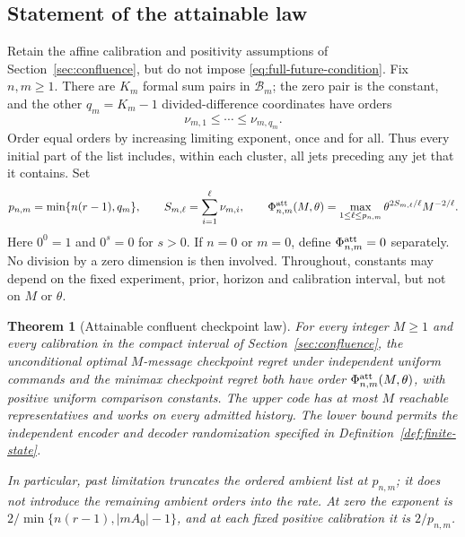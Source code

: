 \documentclass[11pt]{amsart}
\newtheorem{theorem}{Theorem}[section]
\theoremstyle{definition}\newtheorem{definition}[theorem]{Definition}
\theoremstyle{remark}\newtheorem{remark}[theorem]{Remark}
\begin{document}
\subsection{Statement of the attainable law}
Retain the affine calibration and positivity assumptions of
Section~\ref{sec:confluence}, but do not impose
\eqref{eq:full-future-condition}. Fix $n,m\ge1$. There are $K_m$ formal
sum pairs in $\mathcal B_m$; the zero pair is the constant, and the other
$q_m=K_m-1$ divided-difference coordinates have orders
\[
 \nu_{m,1}\le\cdots\le\nu_{m,q_m}.
\]
Order equal orders by increasing limiting exponent, once and for all.
Thus every initial part of the list includes, within each cluster, all
jets preceding any jet that it contains. Set
\begin{equation}\label{eq:attainable-orders}
 p_{n,m}=\min\{n(r-1),q_m\},\qquad
 S_{m,\ell}=\sum_{i=1}^{\ell}\nu_{m,i},\qquad
 \Phi^{\rm att}_{n,m}(M,\theta)
 =\max_{1\le\ell\le p_{n,m}}
       \theta^{2S_{m,\ell}/\ell}M^{-2/\ell}.
\end{equation}
Here $0^0=1$ and $0^s=0$ for $s>0$. If $n=0$ or $m=0$, define
$\Phi^{\rm att}_{n,m}=0$ separately. No division by a zero dimension is
then involved. Throughout, constants may depend on the fixed experiment,
prior, horizon and calibration interval, but not on $M$ or $\theta$.

\begin{theorem}[Attainable confluent checkpoint law]\label{thm:attainable-checkpoint}
For every integer $M\ge1$ and every calibration in the compact interval
of Section~\ref{sec:confluence}, the unconditional optimal $M$-message
checkpoint regret under independent uniform commands and the minimax
checkpoint regret both have order
$\Phi^{\rm att}_{n,m}(M,\theta)$, with positive uniform comparison
constants. The upper code has at most $M$ reachable representatives
and works on every admitted history. The lower bound permits the
independent encoder and decoder randomization specified in
Definition~\ref{def:finite-state}.

In particular, past limitation truncates the ordered ambient list at
$p_{n,m}$; it does not introduce the remaining ambient orders into the
rate. At zero the exponent is
$2/\min\{n(r-1),|mA_0|-1\}$, and at each fixed positive calibration it
is $2/p_{n,m}$.
\end{theorem}
\end{document}
